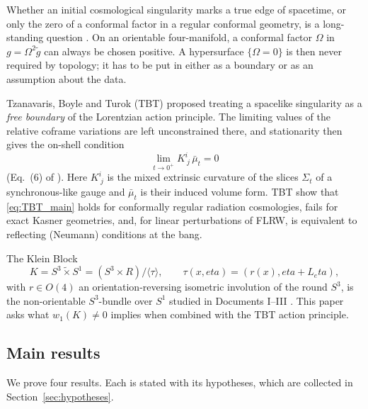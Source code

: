 \documentclass[11pt]{article}
\theoremstyle{canonmath}
\theoremstyle{canonpostulate}
\theoremstyle{canonproposition}
\theoremstyle{canonmath}
\theoremstyle{canonproposition}
\providecommand{\Klein}{\mathcal{K}}
\providecommand{\R}{\mathbb{R}}
\def\mathrm#1{#1}%
\def\mathbb#1{#1}%
\def\mathcal#1{#1}%
\def\eta{eta}%
\begin{document}
Whether an initial cosmological singularity marks a true edge of spacetime, or only the zero of a conformal factor in a regular conformal geometry, is a long-standing question \cite{Penrose1979, Tod1991, Newman1993a}. On an orientable four-manifold, a conformal factor $\Omega$ in $g = \Omega^2\tilde{g}$ can always be chosen positive. A hypersurface $\{\Omega = 0\}$ is then never required by topology; it has to be put in either as a boundary or as an assumption about the data.

Tzanavaris, Boyle and Turok (TBT) \cite{TBT2026} proposed treating a spacelike singularity as a \emph{free boundary} of the Lorentzian action principle. The limiting values of the relative coframe variations are left unconstrained there, and stationarity then gives the on-shell condition
\begin{equation}
\lim_{t \to 0^+} K^i_{\ j}\, \bar{\mu}_t = 0
\label{eq:TBT_main}
\end{equation}
(Eq.~(6) of \cite{TBT2026}). Here $K^i_{\ j}$ is the mixed extrinsic curvature of the slices $\Sigma_t$ of a synchronous-like gauge and $\bar{\mu}_t$ is their induced volume form. TBT show that \eqref{eq:TBT_main} holds for conformally regular radiation cosmologies, fails for exact Kasner geometries, and, for linear perturbations of FLRW, is equivalent to reflecting (Neumann) conditions at the bang.

The Klein Block
\begin{equation}
\Klein = S^3 \tilde{\times} S^1 = (S^3 \times \R)/\langle \tau \rangle, \qquad \tau(x, \eta) = (r(x), \eta + L_\eta),
\label{eq:KleinBlockDef}
\end{equation}
with $r \in \mathrm{O}(4)$ an orientation-reversing isometric involution of the round $S^3$, is the non-orientable $S^3$-bundle over $S^1$ studied in Documents I--III \cite{DocI, DocII, DocIII}. This paper asks what $w_1(\Klein) \neq 0$ implies when combined with the TBT action principle.

\subsection*{Main results}

We prove four results. Each is stated with its hypotheses, which are collected in Section~\ref{sec:hypotheses}.
\end{document}
